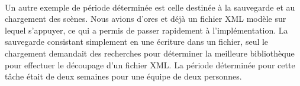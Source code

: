 \paragraph{}
Un autre exemple de période déterminée est celle destinée à la sauvegarde et au chargement des scènes. Nous avions d'ores et déjà un fichier XML modèle sur lequel s'appuyer, ce qui a permis de passer rapidement à l'implémentation. La sauvegarde consistant simplement en une écriture dans un fichier, seul le chargement demandait des recherches pour déterminer la meilleure bibliothèque pour effectuer le découpage d'un fichier XML. La période déterminée pour cette tâche était de deux semaines pour une équipe de deux personnes.
